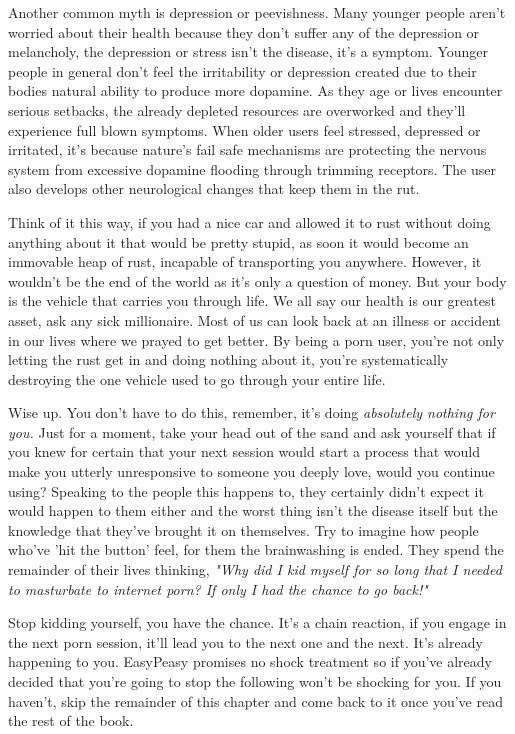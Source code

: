 \documentclass[easypeasy.tex]{subfiles}
\begin{document}
Another common myth is depression or peevishness. Many younger people aren't worried about their health because they don't suffer any of the depression or melancholy, the depression or stress isn't the disease, it's a symptom. Younger people in general don't feel the irritability or depression created due to their bodies natural ability to produce more dopamine. As they age or lives encounter serious setbacks, the already depleted resources are overworked and they'll experience full blown symptoms. When older users feel stressed, depressed or irritated, it's because nature's fail safe mechanisms are protecting the nervous system from excessive dopamine flooding through trimming receptors. The user also develops other neurological changes that keep them in the rut.

Think of it this way, if you had a nice car and allowed it to rust without doing anything about it that would be pretty stupid, as soon it would become an immovable heap of rust, incapable of transporting you anywhere. However, it wouldn't be the end of the world as it's only a question of money. But your body is the vehicle that carries you through life. We all say our health is our greatest asset, ask any sick millionaire. Most of us can look back at an illness or accident in our lives where we prayed to get better. By being a porn user, you're not only letting the rust get in and doing nothing about it, you're systematically destroying the one vehicle used to go through your entire life.

Wise up. You don't have to do this, remember, it's doing \textit{absolutely nothing for you.} Just for a moment, take your head out of the sand and ask yourself that if you knew for certain that your next session would start a process that would make you utterly unresponsive to someone you deeply love, would you continue using? Speaking to the people this happens to, they certainly didn't expect it would happen to them either and the worst thing isn't the disease itself but the knowledge that they've brought it on themselves. Try to imagine how people who've 'hit the button' feel, for them the brainwashing is ended. They spend the remainder of their lives thinking, \textit{"Why did I kid myself for so long that I needed to masturbate to internet porn? If only I had the chance to go back!"}

Stop kidding yourself, you have the chance. It's a chain reaction, if you engage in the next porn session, it'll lead you to the next one and the next. It's already happening to you. EasyPeasy promises no shock treatment so if you've already decided that you're going to stop the following won't be shocking for you. If you haven't, skip the remainder of this chapter and come back to it once you've read the rest of the book.
\end{document}
